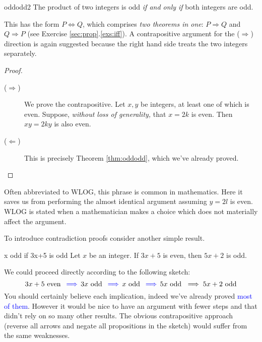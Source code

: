 \begin{thm}{}{oddodd2}
	The product of two integers is odd \emph{if and only if} both integers are odd.
\end{thm}

This has the form $P\Longleftrightarrow Q$, which comprises \emph{two theorems in one}: $P\Longrightarrow Q$ and $Q\Longrightarrow P$ (see Exercise \ref*{sec:prop}.\ref{exs:iff}). A contrapositive argument for the ($\Rightarrow$) direction is again suggested because the right hand side treats the two integers separately.

\begin{proof}
\begin{description}
	\item[\normalfont ($\Rightarrow$)] We prove the contrapositive. Let $x,y$ be integers, at least one of which is even. Suppose, \emph{without loss of generality,} that $x=2k$ is even. Then $xy=2ky$ is also even.
	\item[\normalfont ($\Leftarrow$)] This is precisely Theorem \ref{thm:oddodd}, which we've already proved.\qedhere
\end{description}
\end{proof}

 Often abbreviated to WLOG, this phrase is common in mathematics. Here it saves us from performing the almost identical argument assuming  $y=2l$ is even. WLOG is stated when a mathematician makes a choice which does not materially affect the argument.



To introduce contradiction proofs consider another simple result.


\begin{thm}{}{x odd if 3x+5 is odd}
	Let $x$ be an integer. If $3x+5$ is even, then $5x+2$ is odd.
\end{thm}

We could proceed directly according to the following sketch:
\[3x+5\text{ even }\operatorname{\textcolor{blue}{\implies}} 3x\text{ odd }\operatorname{\textcolor{blue}{\implies}} x\text{ odd }\operatorname{\textcolor{blue}{\implies}} 5x\text{ odd }\implies 5x+2\text{ odd}\]
You should certainly believe each implication, indeed we've already proved \textcolor{blue}{most of them}. However it would be nice to have an argument with fewer steps and that didn't rely on so many other results. The obvious contrapositive approach (reverse all arrows and negate all propositions in the sketch) would suffer from the same weaknesses.\smallbreak

